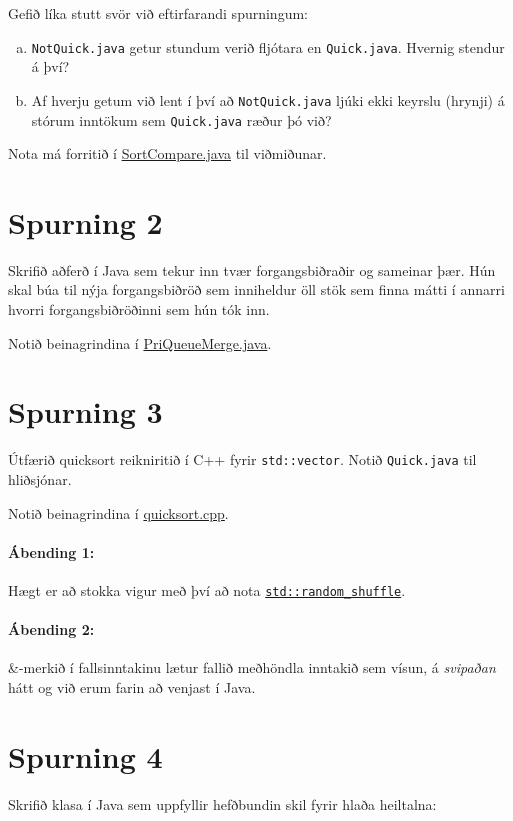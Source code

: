 \documentclass{article}
\begin{document}
Gefið líka stutt svör við eftirfarandi spurningum:

\begin{enumerate}[a)]
 \item \texttt{NotQuick.java} getur stundum verið fljótara en \texttt{Quick.java}. Hvernig stendur á því?
 \item Af hverju getum við lent í því að \texttt{NotQuick.java} ljúki ekki keyrslu (hrynji) á stórum inntökum sem \texttt{Quick.java} ræður þó við?
\end{enumerate}

Nota má forritið í \href{https://github.com/Ernir/kennsluefni/tree/master/T2/Code/w7/SortCompare.java}{SortCompare.java} til viðmiðunar.

\section{Spurning 2}
Skrifið aðferð í Java sem tekur inn tvær forgangsbiðraðir og sameinar þær. 
Hún skal búa til nýja forgangsbiðröð sem inniheldur öll stök sem finna mátti í annarri hvorri forgangsbiðröðinni sem hún tók inn.

Notið beinagrindina í \href{https://github.com/Ernir/kennsluefni/tree/master/T2/Code/w7/PriQueueMerge.java}{PriQueueMerge.java}.

\section{Spurning 3}
Útfærið quicksort reikniritið í C++ fyrir \texttt{std::vector}. Notið \texttt{Quick.java} til hliðsjónar.

Notið beinagrindina í \href{https://github.com/Ernir/kennsluefni/tree/master/T2/Code/w7/quicksort.cpp}{quicksort.cpp}.

\paragraph{Ábending 1:} Hægt er að stokka vigur með því að nota \href{http://www.cplusplus.com/reference/algorithm/random_shuffle/}{\texttt{std::random\_shuffle}}.
\paragraph{Ábending 2:} \&-merkið í fallsinntakinu lætur fallið meðhöndla inntakið sem vísun, á \emph{svipaðan} hátt og við erum farin að venjast í Java.

\section{Spurning 4}
Skrifið klasa í Java sem uppfyllir hefðbundin skil fyrir hlaða heiltalna:
\end{document}
